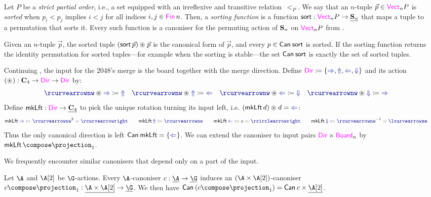 \begin{example}
  Let $P$ be a \emph{strict partial order}, i.e., a set equipped with
  an irreflexive and transitive relation~$<_P$. We say that an
  $n$-tuple $\vec p \in \Vct n P$ is \emph{sorted} when $p_{i} <
  p_{j}$ implies $i < j$ for all indices $i, j \in \Fin n$. Then, a
  \emph{sorting function} is a function $\sort : \Vct n P \to
  \carrier{\Sym n}$ that maps a tuple to a permutation that sorts it.
  Every such function is a canoniser for the permuting action of $\mathbf{S}_{n}$ on $\Vct n P$ from .

  Given an $n$-tuple $\vec p$, the sorted tuple $(\sort \vec p) \act
  \vec p$ is the canonical form of $\vec p$, and every $p \in \mathop{\mathsf{Can}}\nolimits_{}{\mathop{\mathsf{sort}}\nolimits}$
  is sorted. If the sorting function returns the identity
  permutation for sorted tuples---for example when the sorting is
  stable---the set $\mathop{\mathsf{Can}}\nolimits_{}{\mathop{\mathsf{sort}}\nolimits}$ is exactly the set of sorted tuples.
\end{example}

\begin{example}
  Continuing , the input for the 2048's merge
  is the board together with the merge direction. Define $\Direction
  \definedby \set{\Rt, \Up, \Lt, \Dn}$ and its action $(\act) : \Cyc 4
  \to \Direction \to \Direction$ by:
  \[
    \Rotation \act \Rt \definedby \Up
    \quad
    \Rotation \act \Up \definedby \Lt
    \quad
    \Rotation \act \Lt \definedby \Dn
    \quad
    \Rotation \act \Dn \definedby \Rt
  \]
  Define $\mkLt[] : \Direction \to \carrier{\Cyc 4}$ to pick the
  unique rotation turning its input left, i.e. $(\mkLt d) \act d = \Lt
  $:
  \[
    \mkLt \Rt \definedby \Rotation^2 = \twiceRotation
    \qquad
    \mkLt \Up \definedby \Rotation
    \qquad
    \mkLt \Lt \definedby \unit = \nonRotation
    \qquad
    \mkLt \Dn \definedby \inv\Rotation = \unRotation
  \]
  Thus the only canonical direction is left
  $\Canon{\mkLt[]} = \set{\Lt}$. We can extend the
  canoniser to input pairs $\Direction \times \Board n$ by
  $\mkLt \compose \projection_1$.
\end{example}

We frequently encounter similar canonisers that depend only on a part of the
input.

\begin{lemma}
  Let $\A$ and $\B$ be $\G$-actions. Every $\A$-canoniser $\canoniser
  : \carrier\A \to \carrier\G$ induces an
  $(\A\times\B)$-canoniser $\canoniser \compose \projection_1 :
  \carrier {\A \times\B} \to \carrier \G$. We then have
  $\Canon{\parent{\canoniser \compose \projection_1}} =
  \Canon\canoniser \times \carrier\B$.
\end{lemma}

